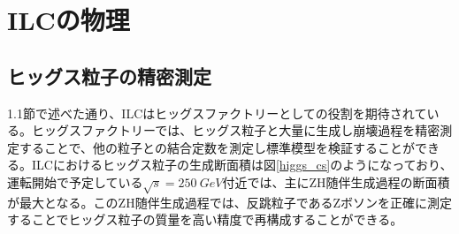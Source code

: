 \section{ILCの物理}
\subsection{ヒッグス粒子の精密測定}
1.1節で述べた通り、ILCはヒッグスファクトリーとしての役割を期待されている。ヒッグスファクトリーでは、ヒッグス粒子と大量に生成し崩壊過程を精密測定することで、他の粒子との結合定数を測定し標準模型を検証することができる。ILCにおけるヒッグス粒子の生成断面積は図\ref{higgs_cs}のようになっており、運転開始で予定している$\sqrt{s}=250\ GeV$付近では、主にZH随伴生成過程の断面積が最大となる。このZH随伴生成過程では、反跳粒子であるZボソンを正確に測定することでヒッグス粒子の質量を高い精度で再構成することができる。\\
